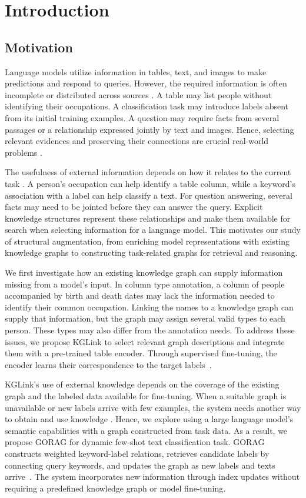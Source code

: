 \chapter{Introduction}
\label{ch:introduction}

\section{Motivation}
\label{sec:introduction:motivation}
Language models utilize information in tables, text, and images to make predictions and respond to queries. 
However, the required information is often incomplete or distributed across sources \cite{}. A table may list people without identifying their occupations. A classification task may introduce labels absent from its initial training examples. A question may require facts from several passages or a relationship expressed jointly by text and images. 
Hence, selecting relevant evidences and preserving their connections are crucial real-world problems \cite{}.

The usefulness of external information depends on how it relates to the current task \cite{}. A person's occupation can help identify a table column, while a keyword's association with a label can help classify a text. For question answering, several facts may need to be jointed before they can answer the query. Explicit knowledge structures represent these relationships and make them available for search when selecting information for a language model. This motivates our study of structural augmentation, from enriching model representations with existing knowledge graphs to constructing task-related graphs for retrieval and reasoning.

We first investigate how an existing knowledge graph can supply information missing from a model's input. In column type annotation, a column of people accompanied by birth and death dates may lack the information needed to identify their common occupation. Linking the names to a knowledge graph can supply that information, but the graph may assign several valid types to each person. These types may also differ from the annotation needs. To address these issues, we propose KGLink to select relevant graph descriptions and integrate them with a pre-trained table encoder. Through supervised fine-tuning, the encoder learns their correspondence to the target labels~\cite{kglink-publication}.

KGLink's use of external knowledge depends on the coverage of the existing graph and the labeled data available for fine-tuning. When a suitable graph is unavailable or new labels arrive with few examples, the system needs another way to obtain and use knowledge \cite{}. Hence, we explore using a large language model's semantic capabilities with a graph constructed from task data. As a result, we propose GORAG for dynamic few-shot text classification task. GORAG constructs weighted keyword-label relations, retrieves candidate labels by connecting query keywords, and updates the graph as new labels and texts arrive~\cite{gorag-paper}. The system incorporates new information through index updates without requiring a predefined knowledge graph or model fine-tuning.

